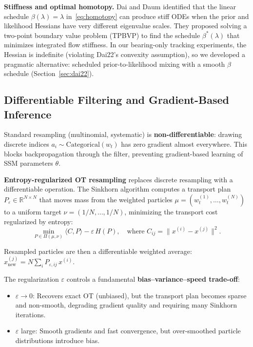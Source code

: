 \documentclass[12pt,a4paper]{article}
\theoremstyle{definition}
\theoremstyle{remark}
\newcommand{\R}{\mathbb{R}}
\begin{document}
\textbf{Stiffness and optimal homotopy.} Dai and Daum \citep{dai2022} identified that the linear schedule $\beta(\lambda) = \lambda$ in~\eqref{eq:homotopy} can produce stiff ODEs when the prior and likelihood Hessians have very different eigenvalue scales. They proposed solving a two-point boundary value problem (TPBVP) to find the schedule $\beta^*(\lambda)$ that minimizes integrated flow stiffness. In our bearing-only tracking experiments, the Hessian is indefinite (violating Dai22's convexity assumption), so we developed a pragmatic alternative: scheduled prior-to-likelihood mixing with a smooth $\beta$ schedule (Section~\ref{sec:dai22}).

\subsection{Differentiable Filtering and Gradient-Based Inference}
\label{sec:bg-dpf}

Standard resampling (multinomial, systematic) is \textbf{non-differentiable}: drawing discrete indices $a_i \sim \text{Categorical}(w_t)$ has zero gradient almost everywhere. This blocks backpropagation through the filter, preventing gradient-based learning of SSM parameters $\theta$.

\textbf{Entropy-regularized OT resampling} \citep{corenflos2021} replaces discrete resampling with a differentiable operation. The Sinkhorn algorithm computes a transport plan $P_\varepsilon \in \R^{N \times N}$ that moves mass from the weighted particles $\mu = (w_t^{(1)}, \ldots, w_t^{(N)})$ to a uniform target $\nu = (1/N, \ldots, 1/N)$, minimizing the transport cost regularized by entropy:
\begin{equation}
	\min_{P \in \Pi(\mu, \nu)} \langle C, P \rangle - \varepsilon \, H(P), \quad \text{where } C_{ij} = \|x^{(i)} - x^{(j)}\|^2.
\end{equation}

Resampled particles are then a differentiable weighted average: $x_\text{new}^{(j)} = N \sum_i P_{\varepsilon,ij} \, x^{(i)}$.

The regularization $\varepsilon$ controls a fundamental \textbf{bias--variance--speed trade-off}:
\begin{itemize}[leftmargin=*]
	\item $\varepsilon \to 0$: Recovers exact OT (unbiased), but the transport plan becomes sparse and non-smooth, degrading gradient quality and requiring many Sinkhorn iterations.
	\item $\varepsilon$ large: Smooth gradients and fast convergence, but over-smoothed particle distributions introduce bias.
\end{itemize}
\end{document}
